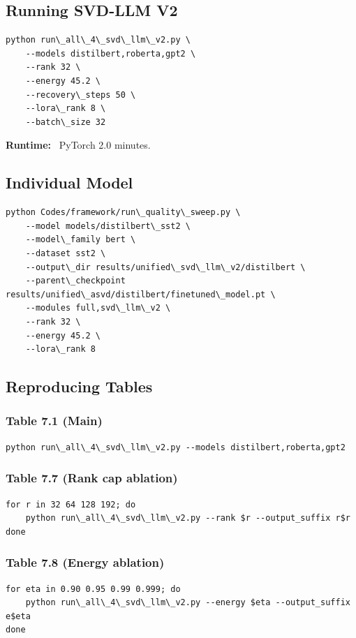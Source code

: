 \subsection{Running SVD-LLM V2}

\begin{lstlisting}
python run\_all\_4\_svd\_llm\_v2.py \
    --models distilbert,roberta,gpt2 \
    --rank 32 \
    --energy 45.2 \
    --recovery\_steps 50 \
    --lora\_rank 8 \
    --batch\_size 32
\end{lstlisting}

\textbf{Runtime:} ~PyTorch 2.0 minutes.

\subsection{Individual Model}

\begin{lstlisting}
python Codes/framework/run\_quality\_sweep.py \
    --model models/distilbert\_sst2 \
    --model\_family bert \
    --dataset sst2 \
    --output\_dir results/unified\_svd\_llm\_v2/distilbert \
    --parent\_checkpoint results/unified\_asvd/distilbert/finetuned\_model.pt \
    --modules full,svd\_llm\_v2 \
    --rank 32 \
    --energy 45.2 \
    --lora\_rank 8
\end{lstlisting}

\subsection{Reproducing Tables}

\subsubsection{Table 7.1 (Main)}
\begin{lstlisting}
python run\_all\_4\_svd\_llm\_v2.py --models distilbert,roberta,gpt2
\end{lstlisting}

\subsubsection{Table 7.7 (Rank cap ablation)}
\begin{lstlisting}
for r in 32 64 128 192; do
    python run\_all\_4\_svd\_llm\_v2.py --rank $r --output_suffix r$r
done
\end{lstlisting}

\subsubsection{Table 7.8 (Energy ablation)}
\begin{lstlisting}
for eta in 0.90 0.95 0.99 0.999; do
    python run\_all\_4\_svd\_llm\_v2.py --energy $eta --output_suffix e$eta
done
\end{lstlisting}


